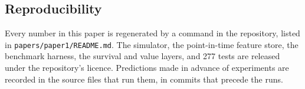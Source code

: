 \documentclass[11pt,a4paper]{article}
\begin{document}
\subsection*{Reproducibility}

Every number in this paper is regenerated by a command in the repository, listed in
\texttt{papers/paper1/README.md}. The simulator, the point-in-time feature store, the
benchmark harness, the survival and value layers, and 277 tests are released under
the repository's licence. Predictions made in advance of experiments are recorded in
the source files that run them, in commits that precede the runs.



\end{document}
